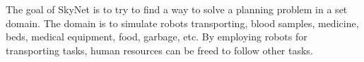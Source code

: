 \documentclass[Main]{subfiles}
\begin{document}
The goal of SkyNet is to try to find a way to solve a planning problem in a set domain. The domain is to simulate robots transporting, blood samples, medicine, beds, medical equipment, food, garbage, etc. By employing robots for transporting tasks, human resources can be freed to follow other tasks. \par
\end{document}
